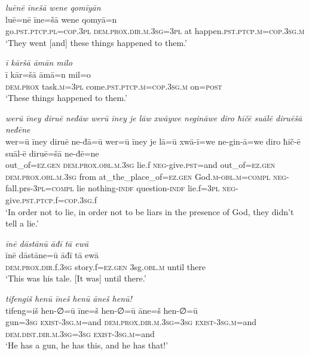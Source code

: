 \ea \label{BP.209}
\textit{luēnē īnešā wene qomīyān} \\ 
\gll luē=nē īne=šā wene qomyā=n \\ 
 go\textsc{.pst}\textsc{.ptcp}\textsc{.pl}\textsc{=cop}\textsc{.3pl} \textsc{dem.prox}\textsc{.dir}\textsc{.m}\textsc{.3sg}\textsc{=3pl} at happen\textsc{.pst}\textsc{.ptcp}\textsc{.m}\textsc{=cop}\textsc{.3sg}\textsc{.m} \\ 
\glt `They went [and] these things happened to them.'
\z 
 
\ea \label{BP.210}
\textit{ī kāršā āmān milo} \\ 
\gll ī kār=šā āmā=n mil=o \\ 
 \textsc{dem.prox} task\textsc{.m}\textsc{=3pl} come\textsc{.pst}\textsc{.ptcp}\textsc{.m}\textsc{=cop}\textsc{.3sg}\textsc{.m} on\textsc{=\textsc{post}} \\ 
\glt `These things happened to them.'
\z 
 
\ea \label{BP.211}
\textit{werū īney diruē neđāw werū īney je lāw xwāywe negināwe diro ħīčē suālē diruēšā neđēne} \\ 
\gll wer=ū īney diruē ne-đā=ū wer=ū īney je lā=ū xwā-ī=we ne-gin-ā=we diro ħīč-ē suāl-ē diruē=šā ne-đē=ne \\ 
 out\_of\textsc{=ez.gen} \textsc{dem.prox}\textsc{.obl}\textsc{.m}\textsc{.3sg} lie.f \textsc{neg-}give\textsc{.pst}=and out\_of\textsc{=ez.gen} \textsc{dem.prox}\textsc{.obl}\textsc{.m}\textsc{.3sg} from at\_the\_place\_of\textsc{=ez.gen} God\textsc{.m}\textsc{-obl}\textsc{.m}\textsc{=compl} \textsc{neg-}fall.prs\textsc{-3pl}\textsc{=compl} lie nothing\textsc{-indf} question\textsc{-indf} lie.f\textsc{=3pl} \textsc{neg-}give\textsc{.pst}\textsc{.ptcp}.f\textsc{=cop}\textsc{.3sg}.f \\ 
\glt `In order not to lie, in order not to be liars in the presence of God, they didn’t tell a lie.'
\z 
 
\ea \label{BP.212}
\textit{īnē dāstānū āđī tā ewā} \\ 
\gll īnē dāstāne=ū āđī tā ewā \\ 
 \textsc{dem.prox}\textsc{.dir}.f\textsc{.3sg} story.f\textsc{=ez.gen} 3sg\textsc{.obl}\textsc{.m} until there \\ 
\glt `This was his tale. [It was] until there.'
\z 
 

\ea \label{ŠJ.12}
\textit{tifengiš henū īneš henū āneš henū!} \\ 
\gll tifeng=iš hen-∅=ū īne=š hen-∅=ū āne=š hen-∅=ū \\ 
 gun\textsc{=3sg} \textsc{exist}\textsc{-3sg}\textsc{.m}=and \textsc{dem.prox}\textsc{.dir}\textsc{.m}\textsc{.3sg}\textsc{=3sg} \textsc{exist}\textsc{-3sg}\textsc{.m}=and \textsc{dem.dist}\textsc{.dir}\textsc{.m}\textsc{.3sg}\textsc{=3sg} \textsc{exist-3sg.m}=and \\ 
\glt `He has a gun, he has this, and he has that!'
\z 
 
